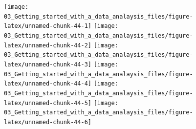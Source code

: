 \documentclass[
]{book}
\newenvironment{Shaded}{\begin{snugshade}}{\end{snugshade}}
\newcommand{\AttributeTok}[1]{\textcolor[rgb]{0.77,0.63,0.00}{#1}}
\newcommand{\CommentTok}[1]{\textcolor[rgb]{0.56,0.35,0.01}{\textit{#1}}}
\newcommand{\DecValTok}[1]{\textcolor[rgb]{0.00,0.00,0.81}{#1}}
\newcommand{\FloatTok}[1]{\textcolor[rgb]{0.00,0.00,0.81}{#1}}
\newcommand{\FunctionTok}[1]{\textcolor[rgb]{0.00,0.00,0.00}{#1}}
\newcommand{\NormalTok}[1]{#1}
\newcommand{\SpecialCharTok}[1]{\textcolor[rgb]{0.00,0.00,0.00}{#1}}
\newcommand{\StringTok}[1]{\textcolor[rgb]{0.31,0.60,0.02}{#1}}
\begin{document}
\begin{Shaded}
\end{Shaded}

\begin{figure}
\texttt{[image: 03\_Getting\_started\_with\_a\_data\_analaysis\_files/figure-latex/unnamed-chunk-44-1]} \texttt{[image: 03\_Getting\_started\_with\_a\_data\_analaysis\_files/figure-latex/unnamed-chunk-44-2]} \texttt{[image: 03\_Getting\_started\_with\_a\_data\_analaysis\_files/figure-latex/unnamed-chunk-44-3]} \texttt{[image: 03\_Getting\_started\_with\_a\_data\_analaysis\_files/figure-latex/unnamed-chunk-44-4]} \texttt{[image: 03\_Getting\_started\_with\_a\_data\_analaysis\_files/figure-latex/unnamed-chunk-44-5]} \texttt{[image: 03\_Getting\_started\_with\_a\_data\_analaysis\_files/figure-latex/unnamed-chunk-44-6]} \end{figure}
\end{document}
